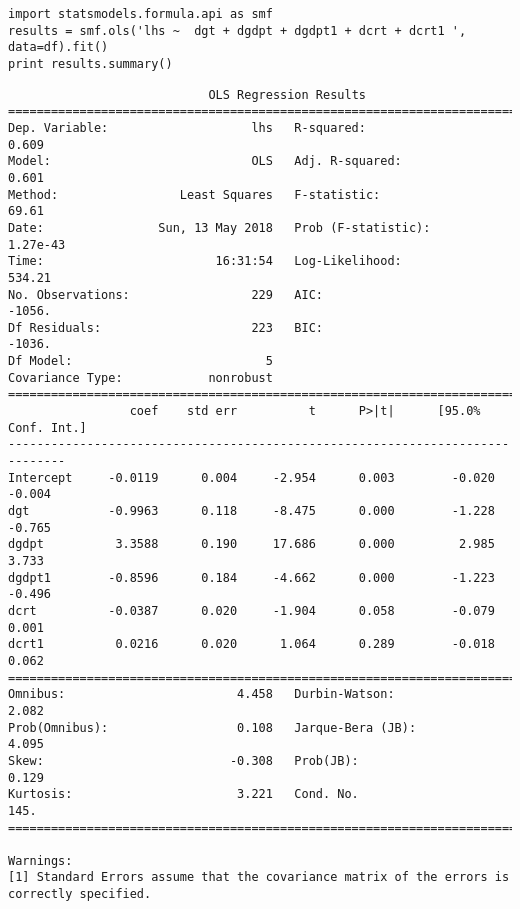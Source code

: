 \documentclass[12pt,fleqn]{article}\usepackage{../../common}
\begin{document}
\begin{verbatim}
import statsmodels.formula.api as smf
results = smf.ols('lhs ~  dgt + dgdpt + dgdpt1 + dcrt + dcrt1 ', data=df).fit()
print results.summary()
\end{verbatim}

\begin{verbatim}
                            OLS Regression Results                            
==============================================================================
Dep. Variable:                    lhs   R-squared:                       0.609
Model:                            OLS   Adj. R-squared:                  0.601
Method:                 Least Squares   F-statistic:                     69.61
Date:                Sun, 13 May 2018   Prob (F-statistic):           1.27e-43
Time:                        16:31:54   Log-Likelihood:                 534.21
No. Observations:                 229   AIC:                            -1056.
Df Residuals:                     223   BIC:                            -1036.
Df Model:                           5                                         
Covariance Type:            nonrobust                                         
==============================================================================
                 coef    std err          t      P>|t|      [95.0% Conf. Int.]
------------------------------------------------------------------------------
Intercept     -0.0119      0.004     -2.954      0.003        -0.020    -0.004
dgt           -0.9963      0.118     -8.475      0.000        -1.228    -0.765
dgdpt          3.3588      0.190     17.686      0.000         2.985     3.733
dgdpt1        -0.8596      0.184     -4.662      0.000        -1.223    -0.496
dcrt          -0.0387      0.020     -1.904      0.058        -0.079     0.001
dcrt1          0.0216      0.020      1.064      0.289        -0.018     0.062
==============================================================================
Omnibus:                        4.458   Durbin-Watson:                   2.082
Prob(Omnibus):                  0.108   Jarque-Bera (JB):                4.095
Skew:                          -0.308   Prob(JB):                        0.129
Kurtosis:                       3.221   Cond. No.                         145.
==============================================================================

Warnings:
[1] Standard Errors assume that the covariance matrix of the errors is correctly specified.
\end{verbatim}
\end{document}
